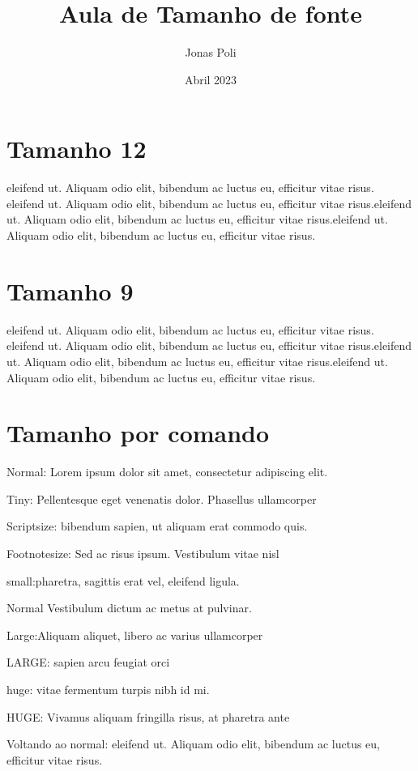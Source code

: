 \documentclass[10pt]{article}
\title{Aula de Tamanho de fonte}
\author{Jonas Poli}
\date{Abril 2023}
\begin{document}
\maketitle

\section{Tamanho 12}
\fontsize{20}{20}\selectfont

eleifend ut. Aliquam odio elit, bibendum ac luctus eu, efficitur vitae risus. eleifend ut. Aliquam odio elit, bibendum ac luctus eu, efficitur vitae risus.eleifend ut. Aliquam odio elit, bibendum ac luctus eu, efficitur vitae risus.eleifend ut. Aliquam odio elit, bibendum ac luctus eu, efficitur vitae risus.


\section{Tamanho 9}

\fontsize{9}{11}\selectfont
eleifend ut. Aliquam odio elit, bibendum ac luctus eu, efficitur vitae risus. eleifend ut. Aliquam odio elit, bibendum ac luctus eu, efficitur vitae risus.eleifend ut. Aliquam odio elit, bibendum ac luctus eu, efficitur vitae risus.eleifend ut. Aliquam odio elit, bibendum ac luctus eu, efficitur vitae risus.


\section{Tamanho por comando}
Normal: Lorem ipsum dolor sit amet, consectetur adipiscing elit. 

\tiny
Tiny: Pellentesque eget venenatis dolor. Phasellus ullamcorper

\scriptsize
Scriptsize: bibendum sapien, ut aliquam erat commodo quis.

\footnotesize 
Footnotesize: Sed ac risus ipsum. Vestibulum vitae nisl 


\small small:pharetra, sagittis erat vel, eleifend ligula. 

\normalsize
Normal Vestibulum dictum ac metus at pulvinar.

\large Large:Aliquam aliquet, libero ac varius ullamcorper


\LARGE LARGE: sapien arcu feugiat orci

\huge huge: vitae fermentum turpis nibh id mi.


\Huge HUGE: Vivamus aliquam fringilla risus, at pharetra ante



\normalsize
Voltando ao normal: eleifend ut. Aliquam odio elit, bibendum ac luctus eu, efficitur vitae risus.
\end{document}
